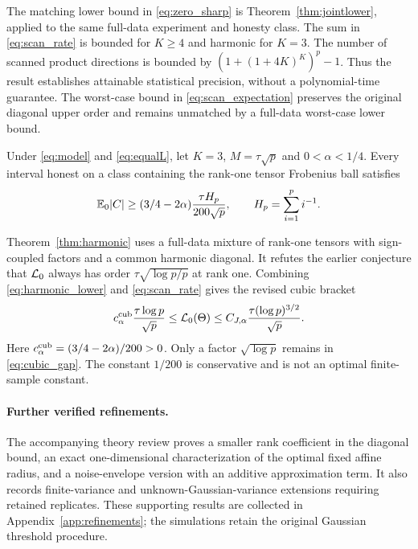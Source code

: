 The matching lower bound in \eqref{eq:zero_sharp} is Theorem~\ref{thm:jointlower}, applied to the same full-data experiment and honesty class. The sum in \eqref{eq:scan_rate} is bounded for $K\ge4$ and harmonic for $K=3$. The number of scanned product directions is bounded by $(1+(1+4K)^K)^p-1$. Thus the result establishes attainable statistical precision, without a polynomial-time guarantee. The worst-case bound in \eqref{eq:scan_expectation} preserves the original diagonal upper order and remains unmatched by a full-data worst-case lower bound.

\begin{theorem}\label{thm:harmonic}
Under \eqref{eq:model} and \eqref{eq:equalL}, let $K=3$, $M=\tau\sqrt p$ and $0<\alpha<1/4$. Every interval honest on a class containing the rank-one tensor Frobenius ball satisfies
\begin{equation}\label{eq:harmonic_lower}
 \mathbb E_0|C|\ge
 (3/4-2\alpha)\frac{\tau H_p}{200\sqrt p},
 \qquad H_p=\sum_{i=1}^p i^{-1}.
\end{equation}
\end{theorem}

Theorem~\ref{thm:harmonic} uses a full-data mixture of rank-one tensors with sign-coupled factors and a common harmonic diagonal. It refutes the earlier conjecture that $\mathcal L_0$ always has order $\tau\sqrt{\log p/p}$ at rank one. Combining \eqref{eq:harmonic_lower} and \eqref{eq:scan_rate} gives the revised cubic bracket
\begin{equation}\label{eq:cubic_gap}
 c_\alpha^{\rm cub}\frac{\tau\log p}{\sqrt p}
 \le\mathcal L_0(\Theta)
 \le C_{J,\alpha}\frac{\tau(\log p)^{3/2}}{\sqrt p}.
\end{equation}
Here $c_\alpha^{\rm cub}=(3/4-2\alpha)/200>0$. Only a factor $\sqrt{\log p}$ remains in \eqref{eq:cubic_gap}. The constant $1/200$ is conservative and is not an optimal finite-sample constant.

\paragraph{Further verified refinements.}
The accompanying theory review proves a smaller rank coefficient in the diagonal bound, an exact one-dimensional characterization of the optimal fixed affine radius, and a noise-envelope version with an additive approximation term. It also records finite-variance and unknown-Gaussian-variance extensions requiring retained replicates. These supporting results are collected in Appendix~\ref{app:refinements}; the simulations retain the original Gaussian threshold procedure.

